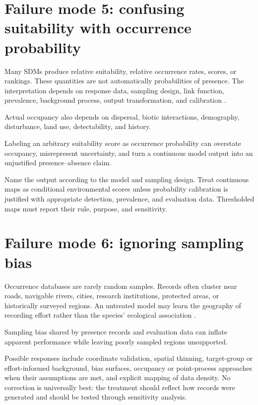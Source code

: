\section{Failure mode 5: confusing suitability with occurrence probability}

Many SDMs produce relative suitability, relative occurrence rates, scores, or rankings. These quantities are not automatically probabilities of presence. The interpretation depends on response data, sampling design, link function, prevalence, background process, output transformation, and calibration \parencite{soberon2007grinnellian,franklin2010mapping,peterson2011ecological}.

Actual occupancy also depends on dispersal, biotic interactions, demography, disturbance, land use, detectability, and history.

\begin{sdmwarningbox}
Labeling an arbitrary suitability score as occurrence probability can overstate occupancy, misrepresent uncertainty, and turn a continuous model output into an unjustified presence--absence claim.
\end{sdmwarningbox}

Name the output according to the model and sampling design. Treat continuous maps as conditional environmental scores unless probability calibration is justified with appropriate detection, prevalence, and evaluation data. Thresholded maps must report their rule, purpose, and sensitivity.

\section{Failure mode 6: ignoring sampling bias}

Occurrence databases are rarely random samples. Records often cluster near roads, navigable rivers, cities, research institutions, protected areas, or historically surveyed regions. An untreated model may learn the geography of recording effort rather than the species' ecological association \parencite{phillips2009sample,kramer2013importance,fourcade2014mapping}.

\begin{sdmwarningbox}
Sampling bias shared by presence records and evaluation data can inflate apparent performance while leaving poorly sampled regions unsupported.
\end{sdmwarningbox}

Possible responses include coordinate validation, spatial thinning, target-group or effort-informed background, bias surfaces, occupancy or point-process approaches when their assumptions are met, and explicit mapping of data density. No correction is universally best: the treatment should reflect how records were generated and should be tested through sensitivity analysis.

